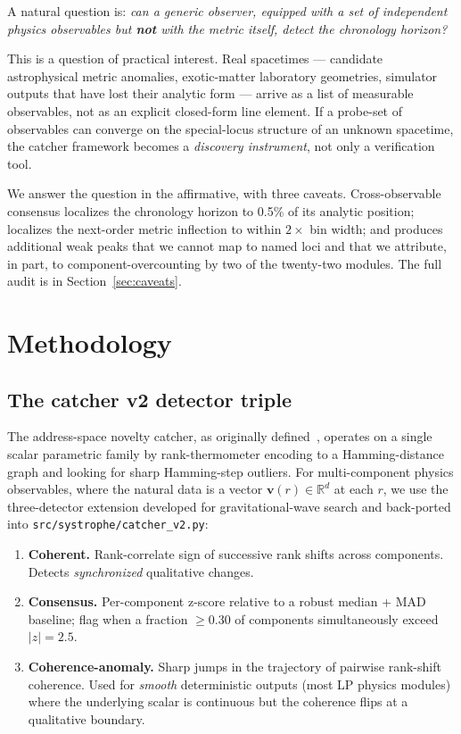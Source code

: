 \documentclass[11pt,letterpaper]{article}
\begin{document}
A natural question is: \emph{can a generic observer, equipped with a set of independent physics observables but \textbf{not} with the metric itself, detect the chronology horizon?}

This is a question of practical interest. Real spacetimes --- candidate astrophysical metric anomalies, exotic-matter laboratory geometries, simulator outputs that have lost their analytic form --- arrive as a list of measurable observables, not as an explicit closed-form line element. If a probe-set of observables can converge on the special-locus structure of an unknown spacetime, the catcher framework becomes a \emph{discovery instrument}, not only a verification tool.

We answer the question in the affirmative, with three caveats. Cross-observable consensus localizes the chronology horizon to 0.5\% of its analytic position; localizes the next-order metric inflection to within $2\times$ bin width; and produces additional weak peaks that we cannot map to named loci and that we attribute, in part, to component-overcounting by two of the twenty-two modules. The full audit is in Section~\ref{sec:caveats}.

\section{Methodology}\label{sec:method}

\subsection{The catcher v2 detector triple}\label{ssec:catcher_v2}

The address-space novelty catcher, as originally defined~\cite{millennium_catcher}, operates on a single scalar parametric family by rank-thermometer encoding to a Hamming-distance graph and looking for sharp Hamming-step outliers. For multi-component physics observables, where the natural data is a vector $\mathbf{v}(r) \in \mathbb{R}^d$ at each $r$, we use the three-detector extension developed for gravitational-wave search and back-ported into \texttt{src/systrophe/catcher\_v2.py}:

\begin{enumerate}[leftmargin=*,itemsep=0pt]
\item \textbf{Coherent.} Rank-correlate sign of successive rank shifts across components. Detects \emph{synchronized} qualitative changes.
\item \textbf{Consensus.} Per-component z-score relative to a robust median + MAD baseline; flag when a fraction $\ge 0.30$ of components simultaneously exceed $|z| = 2.5$.
\item \textbf{Coherence-anomaly.} Sharp jumps in the trajectory of pairwise rank-shift coherence. Used for \emph{smooth} deterministic outputs (most LP physics modules) where the underlying scalar is continuous but the coherence flips at a qualitative boundary.
\end{enumerate}
\end{document}
